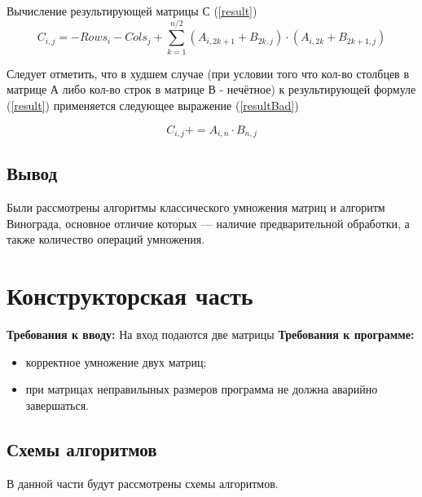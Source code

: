 \documentclass[12pt]{report}
\begin{document}
Вычисление результирующей матрицы С (\ref{result})
\begin{equation} \label{result}
C_{i,j} = -Rows_{i} -  Cols_{j} + \sum\limits_{k = 1}^{n/2} (A_{i, 2k+1} + B_{2k, j}) \cdot (A_{i, 2k} + B_{2k+1,j})
\end{equation}

Следует отметить, что в худшем случае (при условии того что кол-во столбцев в матрице А либо кол-во строк в матрице В - нечётное) к результирующей формуле (\ref{result}) применяется следующее выражение (\ref{resultBad})

\begin{equation} \label{resultBad}
C_{i,j} += A_{i, n} \cdot B_{n, j}
\end{equation}


\section{Вывод}
Были рассмотрены алгоритмы классического умножения матриц и алгоритм Винограда, основное отличие которых — наличие предварительной обработки, а также количество операций умножения.



\chapter{Конструкторская часть}
\textbf{Требования к вводу:}
На вход подаются две матрицы
\newline
\textbf{Требования к программе:}
\begin{itemize}
\item корректное умножение двух матриц;
\item при матрицах неправилыных размеров программа не должна аварийно завершаться.
\end{itemize}

\section{Схемы алгоритмов}
В данной части будут рассмотрены схемы алгоритмов.
\end{document}
